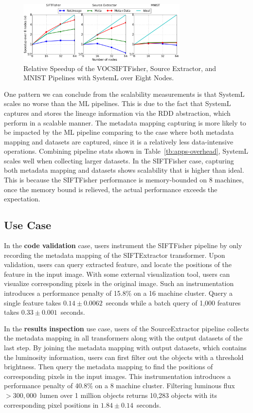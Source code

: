 \documentclass{sig-alternate}
\begin{document}
\begin{figure}[h]
\begin{center}
    \includegraphics[width=85mm]{pictures/Scalability}
\caption {Relative Speedup of the VOCSIFTFisher, Source Extractor, and MNIST Pipelines with SystemL over Eight Nodes.
    \label{fig:scalability}
}
\end{center}
\end{figure}

One pattern we can conclude from the scalability measurements is that SystemL scales no worse than the ML pipelines.
This is due to the fact that SystemL captures and stores the lineage information via the RDD abstraction, which perform
in a scalable manner. 
The metadata mapping capturing is more likely to be impacted by the ML pipeline comparing to the case where both metadata
mapping and datasets are captured, since it is a relatively less data-intensive operations.
Combining pipeline stats shown in Table~\ref{tb:apps-overhead}, SystemL scales  well when collecting larger datasets.
In the SIFTFisher case, capturing both metadata mapping and datasets shows scalability that is higher than ideal.
This is because the SIFTFisher performance is memory-bounded on 8 machines, once the memory bound is relieved, the actual performance
exceeds the expectation.

\subsection{Use Case}
In the {\bf code validation} case, users instrument the SIFTFisher pipeline by only recording the metadata mapping of the SIFTExtractor transformer.
Upon validation, users can query extracted feature, and locate the positions of the feature in the input image. With some external visualization tool,
users can visualize corresponding pixels in the original image. Such an instrumentation introduces a performance penalty of 15.8\% on a 16 machine 
cluster.
Query a single feature takes $0.14\pm0.0062$~seconds while a batch query of 1,000 features takes $0.33\pm0.001$~seconds.

In the {\bf results inspection} use case, users of the SourceExtractor pipeline collects the metadata mapping in all transformers along with the output 
datasets of the last step. By joining the metadata mapping with output datasets, which contains the luminosity information, users can first filter out the
objects with a threshold brightness. Then query the metadata mapping to find the positions of corresponding pixels in the input images.
This instrumentation introduces a performance penalty of 40.8\% on a 8 machine cluster. 
Filtering luminous flux $>300,000$~lumen over 1 million objects returns 10,283 objects
with its corresponding pixel positions in $1.84\pm0.14$~seconds.
\end{document}
